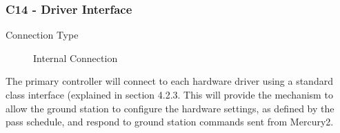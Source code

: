 \documentclass{mxl-note}
\begin{document}
\subsubsection{C14 - Driver Interface}
\begin{description}
	\item [Connection Type] Internal Connection
\end{description}
The primary controller will connect to each hardware driver using a standard class interface (explained in section 4.2.3. This will provide the mechanism to allow the ground station to configure the hardware settings, as defined by the pass schedule, and respond to ground station commands sent from Mercury2.
\end{document}
